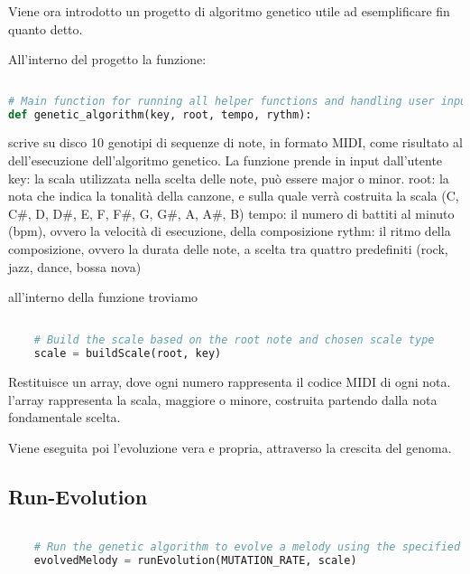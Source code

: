 \documentclass[a4paper,12pt]{report}
\begin{document}
Viene ora introdotto un progetto di algoritmo genetico utile ad esemplificare fin quanto detto.

All'interno del progetto la funzione:

\begin{lstlisting}[language=Python]
 
# Main function for running all helper functions and handling user input.
def genetic_algorithm(key, root, tempo, rythm):

\end{lstlisting}

scrive su disco 10 genotipi di sequenze di note, in formato MIDI, come risultato al dell'esecuzione dell'algoritmo genetico.
La funzione prende in input dall'utente
key: la scala utilizzata nella scelta delle note, può essere major o minor.
root: la nota che indica la tonalità della canzone, e sulla quale verrà costruita la scala (C, C#, D, D#, E, F, F#, G, G#, A, A#, B)
tempo: il numero di battiti al minuto (bpm), ovvero la velocità di esecuzione, della composizione
rythm: il ritmo della composizione, ovvero la durata delle note, a scelta tra quattro predefiniti (rock, jazz, dance, bossa nova)

all'interno della funzione troviamo

\begin{lstlisting}[language=Python]

    # Build the scale based on the root note and chosen scale type
    scale = buildScale(root, key)

\end{lstlisting}

Restituisce un array, dove ogni numero rappresenta il codice MIDI di ogni nota. l'array rappresenta la scala, maggiore o minore, costruita partendo dalla nota fondamentale scelta.

Viene eseguita poi l'evoluzione vera e propria, attraverso la crescita del genoma.

\subsection{Run-Evolution}

\begin{lstlisting}[language=Python]

    # Run the genetic algorithm to evolve a melody using the specified mutation rate and scale
    evolvedMelody = runEvolution(MUTATION_RATE, scale)

\end{lstlisting}
\end{document}

